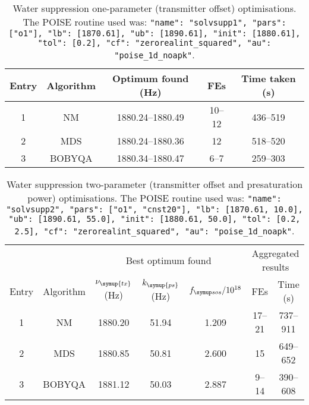 \begin{table}
    \centering
    \begin{tabular}{ccccc}
        \toprule
        Entry & Algorithm & Optimum found (\unit{\Hz}) & FEs    & Time taken (\unit{\s}) \\
        \midrule
        1     & NM        & 1880.24--1880.49         & 10--12 & 436--519             \\
        2     & MDS       & 1880.24--1880.36         & 12     & 518--520             \\
        3     & BOBYQA    & 1880.34--1880.47         & 6--7   & 259--303             \\
        \bottomrule
    \end{tabular}
    \caption[Water suppression one-parameter optimisations]{
        Water suppression one-parameter (transmitter offset) optimisations.
        The POISE routine used was: \texttt{{"name": "solvsupp1", "pars": ["o1"], "lb": [1870.61], "ub": [1890.61], "init": [1880.61], "tol": [0.2], "cf": "zerorealint_squared", "au": "poise_1d_noapk"}}.
    }
    \label{tbl:poise_solvsupp1p}
\end{table}

\begin{table}
    \centering
    \begin{tabular}{ccccccc}
        \toprule
              &           & \multicolumn{3}{c}{Best optimum found} & \multicolumn{2}{c}{Aggregated results} \\
                            \cmidrule(lr){3-5}                       \cmidrule(lr){6-7}
        Entry & Algorithm & $\nu_{\symup{tx}}$ (\unit{\Hz}) & $k_{\symup{ps}}$ (\unit{\Hz}) & $\fsos / 10^{18}$ & FEs    & Time (\unit{\s}) \\
        \midrule
        1     & NM        & 1880.20                    & 51.94          & 1.209                    & 17--21 & 737--911       \\
        2     & MDS       & 1880.85                    & 50.81          & 2.600                    & 15     & 649--652       \\
        3     & BOBYQA    & 1881.12                    & 50.03          & 2.887                    & 9--14  & 390--608       \\
        \bottomrule
    \end{tabular}
    \caption[Water suppression two-parameter optimisations]{
        Water suppression two-parameter (transmitter offset and presaturation power) optimisations.
        The POISE routine used was: \texttt{{"name": "solvsupp2", "pars": ["o1", "cnst20"], "lb": [1870.61, 10.0], "ub": [1890.61, 55.0], "init": [1880.61, 50.0], "tol": [0.2, 2.5], "cf": "zerorealint_squared", "au": "poise_1d_noapk"}}.
    }
    \label{tbl:poise_solvsupp2p}
\end{table}

